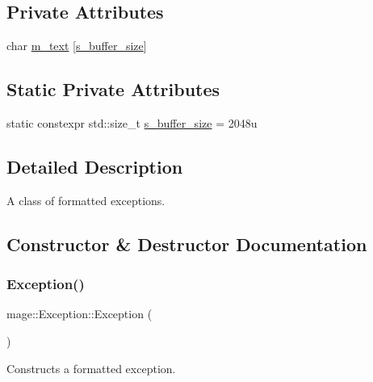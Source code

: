 \subsection*{Private Attributes}
\begin{DoxyCompactItemize}
\item 
char \mbox{\hyperlink{classmage_1_1_exception_ad5bd9bb044bebaa1bac36c8c8a25c052}{m\+\_\+text}} \mbox{[}\mbox{\hyperlink{classmage_1_1_exception_a74a7e3f67eac7dacf8a1a359c730534e}{s\+\_\+buffer\+\_\+size}}\mbox{]}
\end{DoxyCompactItemize}
\subsection*{Static Private Attributes}
\begin{DoxyCompactItemize}
\item 
static constexpr std\+::size\+\_\+t \mbox{\hyperlink{classmage_1_1_exception_a74a7e3f67eac7dacf8a1a359c730534e}{s\+\_\+buffer\+\_\+size}} = 2048u
\end{DoxyCompactItemize}


\subsection{Detailed Description}
A class of formatted exceptions. 

\subsection{Constructor \& Destructor Documentation}
\mbox{\label{classmage_1_1_exception_a87fd5f6c5465c01244020afbaebdb9f5}} 
\subsubsection{\texorpdfstring{Exception()}{Exception()}\hspace{0.1cm}{\footnotesize\ttfamily [1/4]}}
{\footnotesize\ttfamily mage\+::\+Exception\+::\+Exception (\begin{DoxyParamCaption}{ }\end{DoxyParamCaption})}

Constructs a formatted exception. \mbox{\label{classmage_1_1_exception_ab9d0c9f308dab96ff7ba4f6986f40743}} 
